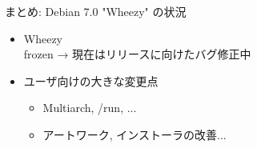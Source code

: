 \begin{frame}[plain]
\begin{center}
\end{center}
\end{frame}


{
\begin{frame}[plain]
\begin{center}
\end{center}

\end{frame}
}


\begin{frame}{まとめ: Debian 7.0 "Wheezy" の状況}

\begin{itemize}
  \item Wheezy \\
  frozen → 現在はリリースに向けたバグ修正中
  \item ユーザ向けの大きな変更点\\
  \begin{itemize}
    \item Multiarch, /run, ... 
    \item アートワーク, インストーラの改善... 
  \end{itemize}
\end{itemize}

\end{frame}

\begin{frame}

\begin{center}
\end{center}

\end{frame}

